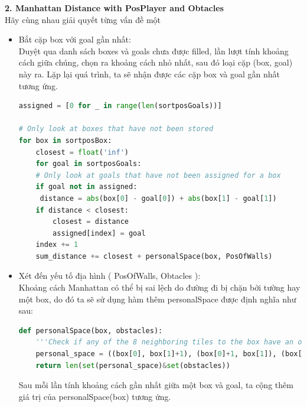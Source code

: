 \documentclass[12pt]{article}
\begin{document}
\hspace{-1em}\textbf{2. Manhattan Distance with PosPlayer and Obtacles} \\

Hãy cùng nhau giải quyết từng vấn đề một
\begin{itemize}
	\item Bắt cặp box với goal gần nhất: \\
	Duyệt qua danh sách boxes và goals chưa được filled, lần lượt tính khoảng cách giữa chúng, chọn ra khoảng cách nhỏ nhất, sau đó loại cặp (box, goal) này ra. Lặp lại quá trình, ta sẽ nhận được các cặp box và goal gần nhất tương ứng.
\begin{tcolorbox}[boxrule=0.5pt, colback=white]
  \begin{lstlisting}[language=python, numbers=none, basicstyle=\ttfamily\footnotesize]
assigned = [0 for _ in range(len(sortposGoals))]

# Only look at boxes that have not been stored
for box in sortposBox:
	closest = float('inf')  
	for goal in sortposGoals:
	# Only look at goals that have not been assigned for a box
	if goal not in assigned:   
	 distance = abs(box[0] - goal[0]) + abs(box[1] - goal[1])
	if distance < closest:
		closest = distance
		assigned[index] = goal
	index += 1
	sum_distance += closest + personalSpace(box, PosOfWalls)
  \end{lstlisting}
  \end{tcolorbox}

  \item Xét đến yếu tố địa hình ( PosOfWalls, Obtacles ): \\
  Khoảng cách Manhattan có thể bị sai lệch do đường đi bị chặn bởi tường hay một box, do đó ta sẽ sử dụng hàm thêm personalSpace được định nghĩa như sau:
  \begin{tcolorbox}[boxrule=0.5pt, colback=white]
	\begin{lstlisting}[language=python, numbers=none, basicstyle=\ttfamily\footnotesize]
def personalSpace(box, obstacles):
	'''Check if any of the 8 neighboring tiles to the box have an obstacle, if they do increase the cost by number of obstacles in this space'''
	personal_space = ((box[0], box[1]+1), (box[0]+1, box[1]), (box[0]-1, box[1]), (box[0], box[1]-1),(box[0]-1, box[1]-1),(box[0]+1, box[1]+1),(box[0]+1, box[1]-1), (box[0]-1, box[1]+1))
	return len(set(personal_space)&set(obstacles)) 
	\end{lstlisting}
	\end{tcolorbox}
	Sau mỗi lần tính khoảng cách gần nhất giữa một box và goal, ta cộng thêm giá trị của personalSpace(box) tương ứng.


\end{itemize}
\end{document}
